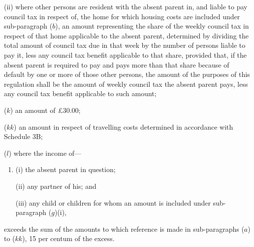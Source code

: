 \documentclass[12pt,a4paper]{article}
\begin{document}
\begin{enumerate}
\begin{enumerate}
(ii) where other persons are resident with the absent parent in, and liable to pay council tax in respect of, the home for which housing costs are included under sub-paragraph ($b$), an amount representing the share of the weekly council tax in respect of that home applicable to the absent parent, determined by dividing the total amount of council tax due in that week by the number of persons liable to pay it, less any council tax benefit applicable to that share, provided that, if the absent parent is required to pay and pays more than that share because of default by one or more of those other persons, the amount of the purposes of this regulation shall be the amount of weekly council tax the absent parent pays, less any council tax benefit applicable to such amount;
\end{enumerate}

($k$) an amount of 
£30.00; %

($kk$) an amount in respect of travelling costs determined in accordance with Schedule 3B;

($l$) where the income of—
\begin{enumerate}\item[]
(i) the absent parent in question;

(ii) any partner of his; and

(iii) any child or children for whom an amount is included under sub-paragraph ($g$)(i),
\end{enumerate}
exceeds the sum of the amounts to which reference is made in sub-paragraphs 
($a$) to ($kk$),  %
15 per centum %
of the excess.
\end{enumerate}
\end{document}
